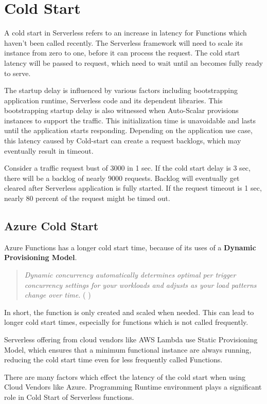 \documentclass{article}
\begin{document}
\section{Cold Start}

\begin{flushleft}
\par
A cold start in Serverless refers to an increase in latency for Functions which haven’t been called recently. The Serverless framework will need to scale its instance from zero to one, before it can process the request. The cold start latency will be passed to request, which need to wait until an becomes fully ready to serve.
\par
 The startup delay is influenced by various factors including bootstrapping application runtime, Serverless code and its dependent libraries. This bootstrapping startup delay is also witnessed when Auto-Scalar provisions instances to support the traffic. This initialization time is unavoidable and lasts until the application starts responding. Depending on the application use case, this latency caused by Cold-start can create a request backlogs, which may eventually result in timeout.
\par
 Consider a traffic request bust of 3000 in 1 sec. If the cold start delay is 3 sec, there will be a backlog of nearly 9000 requests. Backlog will eventually get cleared after Serverless application is fully started. If the request timeout is 1 sec, nearly 80 percent of the request might be timed out.

\subsection{Azure Cold Start}
Azure Functions has a longer cold start time, because of its uses of a \textbf{Dynamic Provisioning Model}.

\begin{quote}
    \textit{Dynamic concurrency automatically determines optimal per trigger concurrency settings for your workloads and adjusts as your load patterns change over time.}    ( \cite{Cachai_Gailey_2022} )
\end{quote}
\par
In short, the function is only created and scaled when needed. This can lead to longer cold start times, especially for functions which is not called frequently.
\par
Serverless offering from cloud vendors like \gls{AWS} Lambda use Static Provisioning Model, which ensures that a minimum functional instance  are always running, reducing the cold start time even for less frequently called Functions.
\par
There are many factors which effect the latency of the cold start when using Cloud Vendors like Azure. Programming Runtime environment plays a significant role in Cold Start of Serverless functions.


\end{flushleft}
\end{document}
